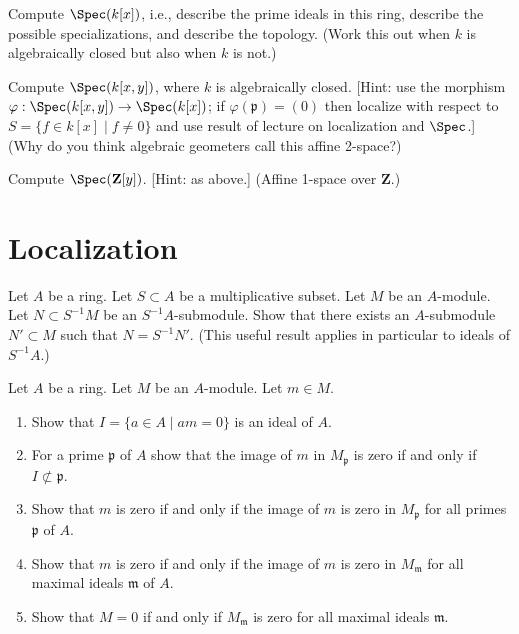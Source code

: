 \begin{exercise}
\label{exercise-primes-kx}
Compute $\Spec(k[x])$, i.e., describe
the prime ideals in this ring, describe the possible specializations, and
describe the topology. (Work this out when $k$ is algebraically closed but
also when $k$ is not.)
\end{exercise}

\begin{exercise}
\label{exercise-primes-kxy}
 Compute $\Spec(k[x, y])$, where $k$ is algebraically
closed.
[Hint: use the morphism
$\varphi : \Spec(k[x, y]) \to \Spec(k[x])$; if
$\varphi({\mathfrak p}) = (0)$ then localize with respect to
$S = \{f\in k[x] \mid f \not = 0\}$ and use result of lecture
on localization and $\Spec$.]
(Why do you think algebraic geometers call this affine 2-space?)
\end{exercise}

\begin{exercise}
\label{exercise-primes-Zy}
Compute $\Spec(\mathbf{Z}[y])$.
[Hint: as above.] (Affine 1-space over $\mathbf{Z}$.)
\end{exercise}






\section{Localization}
\label{section-localization}


\begin{exercise}
\label{exercise-submodule-localization}
Let $A$ be a ring. Let $S \subset A$ be a multiplicative subset.
Let $M$ be an $A$-module. Let $N \subset S^{-1}M$ be an $S^{-1}A$-submodule.
Show that there exists an $A$-submodule $N' \subset M$ such that
$N = S^{-1}N'$. (This useful result applies in particular to ideals
of $S^{-1}A$.)
\end{exercise}

\begin{exercise}
\label{exercise-localize-zero}
Let $A$ be a ring. Let $M$ be an $A$-module. Let $m \in M$.
\begin{enumerate}
\item Show that $I = \{a \in A \mid am = 0\}$ is an ideal of $A$.
\item For a prime $\mathfrak p$ of $A$ show that the image of $m$
in $M_\mathfrak p$ is zero if and only if $I \not \subset \mathfrak p$.
\item Show that $m$ is zero if and only if the image of $m$ is zero
in $M_\mathfrak p$ for all primes $\mathfrak p$ of $A$.
\item Show that $m$ is zero if and only if the image of $m$ is zero
in $M_\mathfrak m$ for all maximal ideals $\mathfrak m$ of $A$.
\item Show that $M = 0$ if and only if $M_{\mathfrak m}$ is zero
for all maximal ideals $\mathfrak m$.
\end{enumerate}
\end{exercise}

